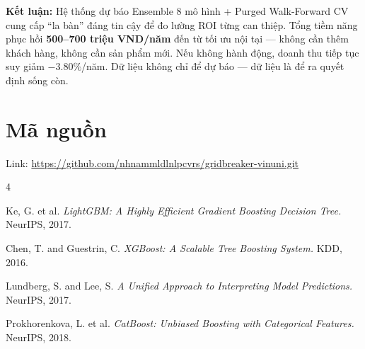 \documentclass{article}
\begin{document}
\textbf{Kết luận:} Hệ thống dự báo Ensemble 8 mô hình + Purged Walk-Forward CV cung cấp ``la bàn'' đáng tin cậy để đo lường ROI từng can thiệp. Tổng tiềm năng phục hồi \textbf{500--700 triệu VND/năm} đến từ tối ưu nội tại --- không cần thêm khách hàng, không cần sản phẩm mới. Nếu không hành động, doanh thu tiếp tục suy giảm $-3.80\%$/năm. Dữ liệu không chỉ để dự báo --- dữ liệu là để ra quyết định sống còn.
\newpage
\section*{Mã nguồn}

Link: \url{https://github.com/nhnammldlnlpcvrs/gridbreaker-vinuni.git}

\begin{thebibliography}{4}

Ke, G. et al. \textit{LightGBM: A Highly Efficient Gradient Boosting Decision Tree.} NeurIPS, 2017.

Chen, T. and Guestrin, C. \textit{XGBoost: A Scalable Tree Boosting System.} KDD, 2016.

Lundberg, S. and Lee, S. \textit{A Unified Approach to Interpreting Model Predictions.} NeurIPS, 2017.

Prokhorenkova, L. et al. \textit{CatBoost: Unbiased Boosting with Categorical Features.} NeurIPS, 2018.

\end{thebibliography}
\end{document}
